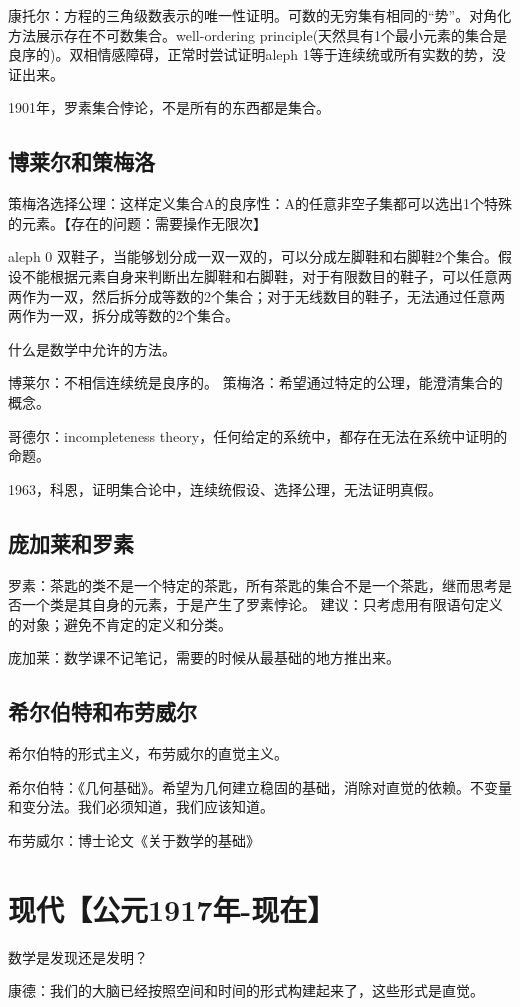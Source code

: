 \documentclass[UTF8]{../09-Mathematics}
\begin{document}
康托尔：方程的三角级数表示的唯一性证明。可数的无穷集有相同的“势”。对角化方法展示存在不可数集合。well-ordering principle(天然具有1个最小元素的集合是良序的)。双相情感障碍，正常时尝试证明aleph 1等于连续统或所有实数的势，没证出来。

1901年，罗素集合悖论，不是所有的东西都是集合。


\section {博莱尔和策梅洛}

策梅洛选择公理：这样定义集合A的良序性：A的任意非空子集都可以选出1个特殊的元素。【存在的问题：需要操作无限次】


aleph 0 双鞋子，当能够划分成一双一双的，可以分成左脚鞋和右脚鞋2个集合。假设不能根据元素自身来判断出左脚鞋和右脚鞋，对于有限数目的鞋子，可以任意两两作为一双，然后拆分成等数的2个集合；对于无线数目的鞋子，无法通过任意两两作为一双，拆分成等数的2个集合。

什么是数学中允许的方法。

博莱尔：不相信连续统是良序的。
策梅洛：希望通过特定的公理，能澄清集合的概念。

哥德尔：incompleteness theory，任何给定的系统中，都存在无法在系统中证明的命题。

1963，科恩，证明集合论中，连续统假设、选择公理，无法证明真假。



\section {庞加莱和罗素}


罗素：茶匙的类不是一个特定的茶匙，所有茶匙的集合不是一个茶匙，继而思考是否一个类是其自身的元素，于是产生了罗素悖论。
建议：只考虑用有限语句定义的对象；避免不肯定的定义和分类。

庞加莱：数学课不记笔记，需要的时候从最基础的地方推出来。


\section {希尔伯特和布劳威尔}

希尔伯特的形式主义，布劳威尔的直觉主义。

希尔伯特：《几何基础》。希望为几何建立稳固的基础，消除对直觉的依赖。不变量和变分法。我们必须知道，我们应该知道。

布劳威尔：博士论文《关于数学的基础》




\chapter{现代【公元1917年-现在】}


数学是发现还是发明？

康德：我们的大脑已经按照空间和时间的形式构建起来了，这些形式是直觉。
\end{document}
